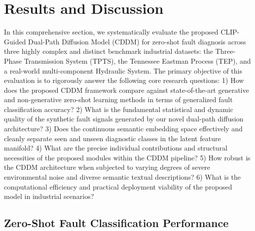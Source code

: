 \section{Results and Discussion}
\label{sec:results}

In this comprehensive section, we systematically evaluate the proposed CLIP-Guided Dual-Path Diffusion Model (CDDM) for zero-shot fault diagnosis across three highly complex and distinct benchmark industrial datasets: the Three-Phase Transmission System (TPTS), the Tennessee Eastman Process (TEP), and a real-world multi-component Hydraulic System. The primary objective of this evaluation is to rigorously answer the following core research questions: 1) How does the proposed CDDM framework compare against state-of-the-art generative and non-generative zero-shot learning methods in terms of generalized fault classification accuracy? 2) What is the fundamental statistical and dynamic quality of the synthetic fault signals generated by our novel dual-path diffusion architecture? 3) Does the continuous semantic embedding space effectively and cleanly separate seen and unseen diagnostic classes in the latent feature manifold? 4) What are the precise individual contributions and structural necessities of the proposed modules within the CDDM pipeline? 5) How robust is the CDDM architecture when subjected to varying degrees of severe environmental noise and diverse semantic textual descriptions? 6) What is the computational efficiency and practical deployment viability of the proposed model in industrial scenarios? 

\subsection{Zero-Shot Fault Classification Performance}
\label{subsec:classification_performance}

